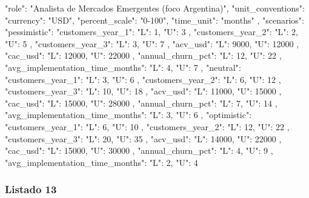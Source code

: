 \begin{APACode}
{
  "role": "Analista de Mercados Emergentes (foco Argentina)",
  "unit_conventions": {
    "currency": "USD",
    "percent_scale": "0-100",
    "time_unit": "months"
  },
  "scenarios": {
    "pessimistic": {
      "customers_year_1": {
        "L": 1,
        "U": 3
      },
      "customers_year_2": {
        "L": 2,
        "U": 5
      },
      "customers_year_3": {
        "L": 3,
        "U": 7
      },
      "acv_usd": {
        "L": 9000,
        "U": 12000
      },
      "cac_usd": {
        "L": 12000,
        "U": 22000
      },
      "annual_churn_pct": {
        "L": 12,
        "U": 22
      },
      "avg_implementation_time_months": {
        "L": 4,
        "U": 7
      }
    },
    "neutral": {
      "customers_year_1": {
        "L": 3,
        "U": 6
      },
      "customers_year_2": {
        "L": 6,
        "U": 12
      },
      "customers_year_3": {
        "L": 10,
        "U": 18
      },
      "acv_usd": {
        "L": 11000,
        "U": 15000
      },
      "cac_usd": {
        "L": 15000,
        "U": 28000
      },
      "annual_churn_pct": {
        "L": 7,
        "U": 14
      },
      "avg_implementation_time_months": {
        "L": 3,
        "U": 6
      }
    },
    "optimistic": {
      "customers_year_1": {
        "L": 6,
        "U": 10
      },
      "customers_year_2": {
        "L": 12,
        "U": 22
      },
      "customers_year_3": {
        "L": 20,
        "U": 35
      },
      "acv_usd": {
        "L": 14000,
        "U": 22000
      },
      "cac_usd": {
        "L": 15000,
        "U": 30000
      },
      "annual_churn_pct": {
        "L": 4,
        "U": 9
      },
      "avg_implementation_time_months": {
        "L": 2,
        "U": 4
      }
    }
  }
}
\end{APACode}

\subsubsection{Listado 13}
\label{anexo:code-6-3-2-13}

